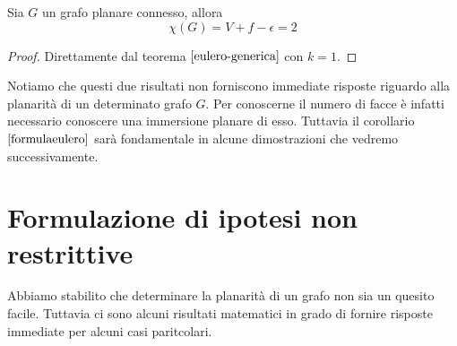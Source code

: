 \begin{corollario}\label{formulaeulero}
    Sia \(G\) un grafo planare connesso, allora
    \begin{equation}
        \chi(G)=V+f-\epsilon = 2
    \end{equation}
    \begin{proof}
        Direttamente dal teorema \(\ref{eulero-generica}\) con \(k=1\).
    \end{proof}
\end{corollario}
Notiamo che questi due risultati non forniscono immediate risposte riguardo alla planarità di un determinato grafo \(G\). Per conoscerne il numero di facce è infatti necessario conoscere una immersione planare di esso. Tuttavia il corollario \(\ref{formulaeulero}\) sarà fondamentale in alcune dimostrazioni che vedremo successivamente.

\section{Formulazione di ipotesi non restrittive}
Abbiamo stabilito che determinare la planarità di un grafo non sia un quesito facile. Tuttavia ci sono alcuni risultati matematici in grado di fornire risposte immediate per alcuni casi paritcolari.

